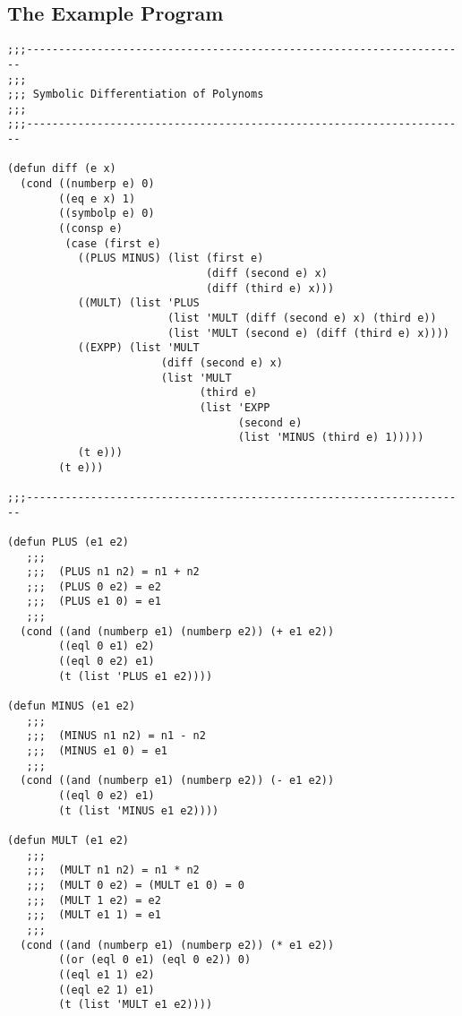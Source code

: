 \begin{appendix}

\newpage
\section{The Example Program}

\begin{verbatim}
;;;---------------------------------------------------------------------
;;;
;;; Symbolic Differentiation of Polynoms
;;;
;;;---------------------------------------------------------------------

(defun diff (e x)
  (cond ((numberp e) 0)
        ((eq e x) 1)
        ((symbolp e) 0)
        ((consp e)
         (case (first e)
           ((PLUS MINUS) (list (first e) 
                               (diff (second e) x) 
                               (diff (third e) x)))
           ((MULT) (list 'PLUS
                         (list 'MULT (diff (second e) x) (third e))
                         (list 'MULT (second e) (diff (third e) x))))
           ((EXPP) (list 'MULT
                        (diff (second e) x)
                        (list 'MULT
                              (third e)
                              (list 'EXPP 
                                    (second e) 
                                    (list 'MINUS (third e) 1)))))
           (t e)))
        (t e)))

;;;---------------------------------------------------------------------
   
(defun PLUS (e1 e2)
   ;;;
   ;;;  (PLUS n1 n2) = n1 + n2
   ;;;  (PLUS 0 e2) = e2
   ;;;  (PLUS e1 0) = e1
   ;;;
  (cond ((and (numberp e1) (numberp e2)) (+ e1 e2))
        ((eql 0 e1) e2)
        ((eql 0 e2) e1)
        (t (list 'PLUS e1 e2))))

(defun MINUS (e1 e2)
   ;;;
   ;;;  (MINUS n1 n2) = n1 - n2
   ;;;  (MINUS e1 0) = e1
   ;;;
  (cond ((and (numberp e1) (numberp e2)) (- e1 e2))
        ((eql 0 e2) e1)
        (t (list 'MINUS e1 e2))))

(defun MULT (e1 e2)
   ;;;
   ;;;  (MULT n1 n2) = n1 * n2
   ;;;  (MULT 0 e2) = (MULT e1 0) = 0
   ;;;  (MULT 1 e2) = e2
   ;;;  (MULT e1 1) = e1 
   ;;;
  (cond ((and (numberp e1) (numberp e2)) (* e1 e2))
        ((or (eql 0 e1) (eql 0 e2)) 0)
        ((eql e1 1) e2)
        ((eql e2 1) e1)
        (t (list 'MULT e1 e2))))


\end{verbatim}
\end{appendix}
